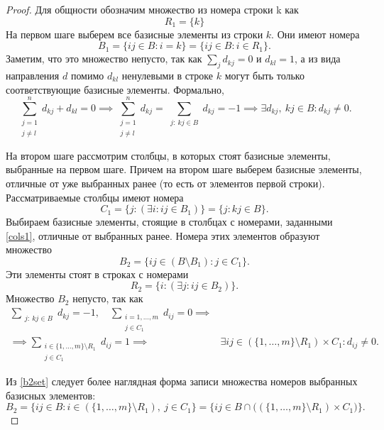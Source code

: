 \documentclass[12pt]{article}
\theoremstyle{definition}
\theoremstyle{plain}
\theoremstyle{definition}
\begin{document}
\begin{proof}
Для общности обозначим множество из номера строки k как
\[
R_1 = \{k\}
\]
На первом шаге выберем все базисные элементы из строки $k$.
Они имеют номера
\[
B_1 = \{ij \in B: i = k\} = \{ij \in B: i \in R_1\}.
\]
Заметим, что это множество непусто, так как
$\sum_{j}d_{kj} = 0$ и $d_{kl} = 1$, а из вида направления $d$ помимо $d_{kl}$
ненулевыми в строке $k$ могут быть только соответствующие базисные элементы.
Формально,
\[
\sum_{\substack{j=1 \\ j \neq l}}^{n} d_{kj} + d_{kl}= 0 \implies
\sum_{\substack{j=1 \\ j \neq l}}^{n} d_{kj} = 
\sum_{\substack{j: \: kj \in B}} d_{kj} = -1 \implies
\exists d_{kj}, \: kj \in B: d_{kj} \neq 0.
\]

На втором шаге рассмотрим столбцы, в которых стоят базисные
элементы, выбранные на первом шаге. Причем на втором шаге выберем базисные
элементы, отличные от уже выбранных ранее (то есть от элементов первой строки).
Рассматриваемые столбцы имеют номера
\begin{equation}\label{cols1}
C_1 = \{j: (\exists i: ij \in B_1)\} = 
\{j: kj \in B\}.
\end{equation}
Выбираем базисные элементы, стоящие в столбцах с номерами, заданными
\eqref{cols1}, отличные от выбранных ранее.
Номера этих элементов образуют множество
\[
B_2 = \{ij \in (B \setminus B_1): j \in C_1\}.
\]
Эти элементы стоят в строках с номерами
\begin{equation}\label{rows2}
R_2 = \{i: (\exists j: ij \in B_2)\}.
\end{equation}
Множество $B_2$ непусто, так как
\begin{equation}\label{b2set}
\begin{aligned}
\sum_{\substack{j: \: kj \in B}} d_{kj} = -1,
\quad \sum_{\substack{i=1,\dots,m \\ j \in C_1}} d_{ij} = 0 \implies &\\
\implies
\sum_{\substack{i \in \{1,\dots,m\} \setminus R_1 \\ j \in C_1}} d_{ij} = 1
\implies & \exists ij \in (\{1,\dots,m\} \setminus R_1) \times C_1: d_{ij} \neq 0.
\end{aligned}
\end{equation}

Из \eqref{b2set} следует более наглядная форма записи множества
номеров выбранных базисных элементов:
\[
B_2 = \{ij \in B: i \in (\{1,\dots,m\} \setminus R_1), \: j \in C_1\} =
\{ij \in B \cap \bigl((\{1,\dots,m\} \setminus R_1) \times C_1\bigr) \}.
\]


\end{proof}
\end{document}
